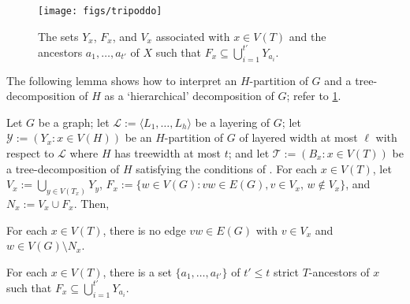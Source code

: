 \documentclass{patmorin}
\newcommand{\note}[2]{\noindent{\color{red}[#1:~#2]}}
\newcommand{\referee}[2]{\noindent\textcolor{blue}{\framebox{\begin{minipage}{\textwidth} Ref \#{#1}: #2\end{minipage}}}}
\newcommand{\ylabel}[1]{\label{y:#1}}
\renewcommand{\le}{\leqslant}
\begin{document}



\begin{figure}[htbp]
  \begin{center}
    \texttt{[image: figs/tripoddo]}
  \end{center}
  \caption{The sets $Y_x$, $F_x$, and $V_x$ associated with $x\in V(T)$
  and the ancestors $a_1,\ldots,a_{t'}$ of $X$ such that $F_x \subseteq \bigcup_{i=1}^{t'} Y_{a_i}$.}
  \label{fig:generalized-tripod}
\end{figure}

The following lemma shows how to interpret an $H$-partition of $G$ and a tree-decomposition of $H$ as a `hierarchical' decomposition of $G$; refer to \cref{fig:generalized-tripod}.

\begin{lem}\label{generalized-tripod}
  Let $G$ be a graph; let $\mathcal{L}:=\langle L_1,\ldots,L_h\rangle$ be a layering of $G$; let $\mathcal{Y}:=(Y_x: x\in V(H))$ be an $H$-partition of $G$ of layered width at most $\ell$ with respect to $\mathcal{L}$ where $H$ has treewidth at most $t$; and let $\mathcal{T}:=(B_x:x\in V(T))$ be a tree-decomposition of $H$ satisfying the conditions of .  For each $x\in V(T)$, let $V_x := \bigcup_{y\in V(T_x)} Y_y$, $F_x:=\{w\in V(G): vw\in E(G), v\in V_x,\, w\not\in V_x\}$, and $N_x:=V_x\cup F_x$.  Then,
  \begin{compactenum}[(Y1)]
    \item\ylabel{separator} For each $x\in V(T)$, there is no edge $vw\in E(G)$ with $v\in V_x$ and $w\in V(G)\setminus N_x$.
    \item\ylabel{ancestor-edge} For each $x\in V(T)$, there is a set $\{a_1,\ldots,a_{t'}\}$ of $t'\le t$ strict $T$-ancestors of $x$ such that $F_x \subseteq \bigcup_{i=1}^{t'} Y_{a_i}$.
  \end{compactenum}
\end{lem}
\end{document}
